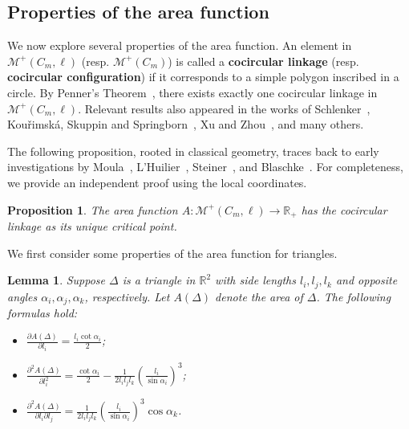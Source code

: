 \documentclass[11pt,letterpaper]{amsart}
\theoremstyle{plain}
\newtheorem{lemma}[theorem]{Lemma}
\newtheorem{proposition}[theorem]{Proposition}
\theoremstyle{definition}
\theoremstyle{remark}
\numberwithin{equation}{section}
\begin{document}
\subsection{Properties of the area function}
We now explore several properties of the area function.
An element in $\mathcal M^{+}(C_m,\ell)$ (resp. $\mathcal M^{+}(C_m)$) is called a \textbf{cocircular linkage} (resp. \textbf{cocircular configuration}) if it corresponds to a simple polygon inscribed in a circle. By Penner's Theorem~\cite[Theorem 6.2]{Penner-1987}, there exists exactly one cocircular linkage in
$\mathcal M^{+}(C_m,\ell)$. Relevant results also appeared in the works of Schlenker~\cite{Schlenker-2007}, Kou\v{r}imsk\'{a}, Skuppin and Springborn~\cite{Kour-Sku-Springborn-2016}, Xu and Zhou~\cite{Xu-2024}, and many others.

The following proposition, rooted in classical geometry, traces back to early investigations by Moula~\cite{Moula-1737}, L'Huilier~\cite{Huilier-1782}, Steiner~\cite{Steiner-1841}, and  Blaschke~\cite{Blaschke-1956}. For completeness, we provide an independent proof using the local coordinates.

\begin{proposition}\label{P-4-4}
The area function $A:\mathcal M^{+}(C_m,\ell)\to\mathbb R_+$ has the cocircular linkage as its unique critical point.
\end{proposition}

We first consider some properties of the area function for triangles.
\begin{lemma}\label{L-4-5}
Suppose $\Delta$ is a triangle in $\mathbb R^2$ with side lengths $l_i,l_j,l_k$ and opposite angles $\alpha_i,\alpha_j,\alpha_k$, respectively. Let $A(\Delta)$ denote the area of $\Delta$. The following formulas hold:
\begin{itemize}
\item[$(i)$] $\displaystyle{\frac{\partial A(\Delta)}{\partial l_i}=\frac{l_i\cot\alpha_i}{2}}$;
\item[$(ii)$] $\displaystyle{\frac{\partial^2 A(\Delta)}{\partial l_i^2}=\frac{\cot\alpha_i}{2}
    -\frac{1}{2l_il_jl_k}\left(\frac{l_i}{\sin\alpha_i}\right)^3}$;
\item[$(iii)$] $\displaystyle{\frac{\partial^2 A(\Delta)}{\partial l_i \partial l_j}=\frac{1}{2l_il_jl_k}\left(\frac{l_i}{\sin\alpha_i}\right)^3\cos\alpha_k}$.
\end{itemize}
\end{lemma}
\end{document}
